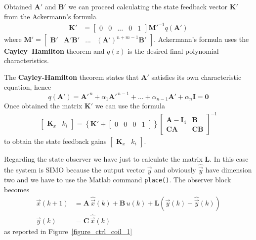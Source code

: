 \documentclass[11pt,a4paper,oneside]{book}
\numberwithin{equation}{section}
\theoremstyle{it}
\theoremstyle{definition}
\begin{document}
Obtained $\mathbf{A'}$ and $\mathbf{B'}$ we can proceed calculating the state 
feedback vector $\mathbf{K'}$ from the Ackermann's formula
\begin{equation*}
	\begin{aligned}
		\mathbf{K'} &= \begin{bmatrix} 0&0&...&0&1 \end{bmatrix} 
		\mathbf{M'}^{-1}q(\mathbf{A'})
	\end{aligned}
\end{equation*}
where $\mathbf{M'} = \begin{bmatrix} 
	\mathbf{B'}&\mathbf{A'}\mathbf{B'}&...&\left( \mathbf{A'}\right) 
	^{n+m-1}\mathbf{B'} \end{bmatrix}$. Ackermann's formula uses the 
\textbf{Cayley–Hamilton} theorem and $q(z)$ is the desired final polynomial 
characteristics.

The \textbf{Cayley-Hamilton} theorem states that $\mathbf{A'}$ satisfies its 
own characteristic equation, hence
\begin{equation} \label{eq:13}
	q(\mathbf{A'}) = 
	\mathbf{A'}^{\,n}+\alpha_1\mathbf{A'}^{\,n-1}+...+\alpha_{n-1}\mathbf{A'}+\alpha_n\mathbf{I}
	= \mathbf{0}
\end{equation}
Once obtained the matrix $\mathbf{K'}$ we can use the formula
\begin{equation}
	\begin{aligned}
		\begin{bmatrix} 
			\mathbf{K}_x & k_i
		\end{bmatrix} = \left\lbrace \mathbf{K'}+
		\begin{bmatrix} 
			0&0&0&1
		\end{bmatrix}\right\rbrace 
		\begin{bmatrix} 
			\mathbf{A}-\mathbf{I}_4 & \mathbf{B}  \\[6pt] 
			\mathbf{C}\mathbf{A} & \mathbf{C}\mathbf{B} 
		\end{bmatrix}^{-1}
	\end{aligned}
\end{equation}
to obtain the state feedback gains 
$\begin{bmatrix}\mathbf{K}_x&k_i\end{bmatrix}$.

Regarding the state observer we have just to calculate the matrix $\mathbf{L}$. 
In this case the system is SIMO because the output vector $\vec{y}$ and 
obviously $\hat{\vec{y}}$ have dimension two and we have to use the Matlab 
command \texttt{place()}. The observer block becomes
\begin{equation}
	\begin{aligned}
		\hat{\vec{x}}(k+1)  &= {\mathbf{A}} \,\hat{\vec{x}}(k) +{\mathbf{B}} 
		\,u(k)+{\mathbf{L}} \left( \vec{y}(k) - \hat{\vec{y}}(k) \right)  
		\\[6pt]
		\hat{\vec{y}}(k)  &= \mathbf{C} \,\hat{\vec{x}}(k)
	\end{aligned}
\end{equation}
as reported in Figure~\ref{figure_ctrl_coil_1}
\end{document}
